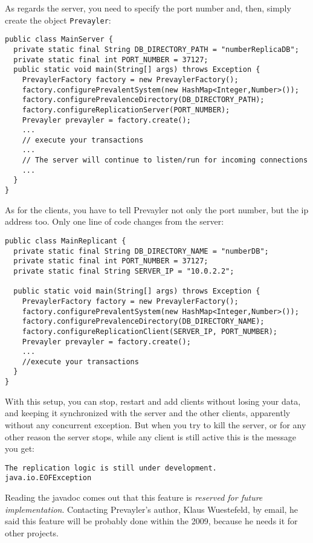 	 		As regards the server, you need to specify the port number and, then, simply create the object 
	 		\lstinline!Prevayler!:
	 		\begin{lstlisting} 
public class MainServer {	
  private static final String DB_DIRECTORY_PATH = "numberReplicaDB";
  private static final int PORT_NUMBER = 37127;	
  public static void main(String[] args) throws Exception {
    PrevaylerFactory factory = new PrevaylerFactory();
    factory.configurePrevalentSystem(new HashMap<Integer,Number>());
    factory.configurePrevalenceDirectory(DB_DIRECTORY_PATH);
    factory.configureReplicationServer(PORT_NUMBER);
    Prevayler prevayler = factory.create();
    ...
    // execute your transactions
    ...
    // The server will continue to listen/run for incoming connections
    ...
  }
}
			\end{lstlisting}
			
			As for the clients, you have to tell Prevayler not only the port number, 
			but the ip address too. Only one line of code changes from the server:
			\begin{lstlisting} 
public class MainReplicant {	
  private static final String DB_DIRECTORY_NAME = "numberDB";
  private static final int PORT_NUMBER = 37127;
  private static final String SERVER_IP = "10.0.2.2";
	
  public static void main(String[] args) throws Exception {
    PrevaylerFactory factory = new PrevaylerFactory();
    factory.configurePrevalentSystem(new HashMap<Integer,Number>());
    factory.configurePrevalenceDirectory(DB_DIRECTORY_NAME);
    factory.configureReplicationClient(SERVER_IP, PORT_NUMBER);
    Prevayler prevayler = factory.create();
    ...
    //execute your transactions
  }
}
			\end{lstlisting}
			
			With this setup, you can stop, restart and add clients without losing your data, 
			and keeping it synchronized with the server and the other clients, 
			apparently without any concurrent exception. But when you try to kill the server, 
			or for any other reason the server stops, while any client is still active this is 
			the message you get: 
			\begin{lstlisting}
The replication logic is still under development.
java.io.EOFException
			\end{lstlisting}
			
			Reading the javadoc comes out that this feature is \emph{reserved for future implementation}. 
			Contacting Prevayler's author, Klaus Wuestefeld, by email, he said this feature 
			will be probably done within the 2009, because he needs it for other projects.
			
